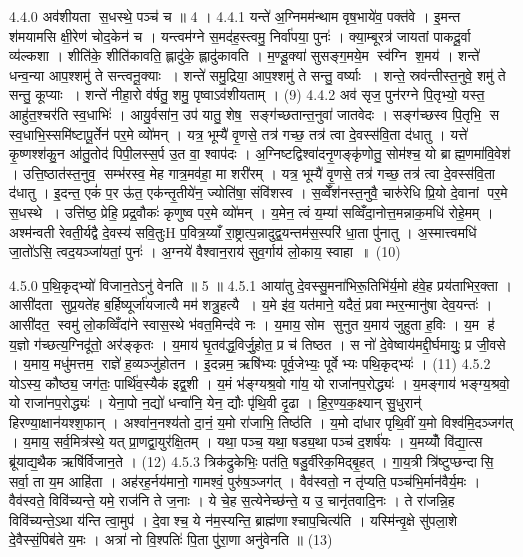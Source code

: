 4.4.0
अव॑शीयता स॒धस्थे॒ पञ्च॑ च ॥ 4 ।
4.4.1
यन्ते॑ अ॒ग्निमम॑न्थाम वृष॒भाये॑व॒ पक्त॑वे । इ॒मन्त श॑मयामसि क्षी॒रेण॑ चोद॒केन॑ च । यन्त्वम॑ग्ने स॒मद॑ह॒स्त्वमु॒ निर्वा॑पया॒ पुनः॑ । क्या॒म्बूरत्र॑ जायतां पाकदू॒र्वा व्य॑ल्कशा । शीति॑के॒ शीति॑कावति॒ ह्लादु॑के॒ ह्लादु॑कावति । म॒ण्डू॒क्या॑ सुसङ्ग॒मये॒म स्व॑ग्नि श॒मय॑ । शन्ते॑ धन्व॒न्या आप॒श्शमु॑ ते सन्त्वनू॒क्याः । शन्ते॑ समु॒द्रिया॒ आप॒श्शमु॑ ते सन्तु॒ वर्ष्याः । शन्ते॒ स्रव॑न्तीस्त॒नुवे॒ शमु॑ ते सन्तु॒ कूप्याः । शन्ते॑ नीहा॒रो व॑र्\mbox{}षतु॒ शमु॒ पृष्वाऽव॑शीयताम् । (9)
4.4.2
अव॑ सृज॒ पुन॑रग्ने पि॒तृभ्यो॒ यस्त॒ आहु॑त॒श्चर॑ति स्व॒धाभिः॑ । आयु॒र्वसा॑न॒ उप॑ यातु॒ शेष॒ सङ्ग॑च्छतान्त॒नुवा॑ जातवेदः । सङ्ग॑च्छस्व पि॒तृभि॒ स स्व॒धाभि॒स्समि॑ष्टापू॒र्तेन॑ पर॒मे व्यो॑मन् । यत्र॒ भूम्यै॑ वृ॒णसे॒ तत्र॑ गच्छ॒ तत्र॑ त्वा दे॒वस्स॑वि॒ता द॑धातु । यत्ते॑ कृ॒ष्णश्श॑कु॒न आ॑तु॒तोद॑ पिपी॒लस्स॒र्प उ॒त वा॒ श्वाप॑दः । अ॒ग्निष्टद्विश्वा॑दनृ॒णङ्कृ॑णोतु॒ सोम॑श्च॒ यो ब्राह्म॒णमा॑वि॒वेश॑ । उत्ति॒ष्ठात॑स्त॒नुव॒ सम्भ॑रस्व॒ मेह गात्र॒मव॑हा॒ मा शरी॑रम् । यत्र॒ भूम्यै॑ वृ॒णसे॒ तत्र॑ गच्छ॒ तत्र॑ त्वा दे॒वस्स॑वि॒ता द॑धातु । इ॒दन्त॒ एकं॑ प॒र ऊ॑त॒ एक॑न्तृ॒तीये॑न॒ ज्योति॑षा॒ संवि॑शस्व । स॒व्वेँश॑नस्त॒नुवै॒ चारु॑रेधि प्रि॒यो दे॒वानां पर॒मे स॒धस्थे । उत्ति॑ष्ठ॒ प्रेहि॒ प्रद्र॒वौकः॑ कृणुष्व पर॒मे व्यो॑मन् । य॒मेन॒ त्वं य॒म्या॑ सव्विँदा॒नोत्त॒मन्नाक॒मधि॑ रोहे॒मम् । अश्म॑न्वती रेवती॒र्यद्वै दे॒वस्य॑ सवि॒तुःH प॒वित्र॒य्याँ रा॒ष्ट्रात्प॒न्नादुद्व॒यन्तम॑स॒स्परि॑ धा॒ता पु॑नातु । अ॒स्मात्त्वमधि॑ जा॒तो॑ऽसि॒ त्वद॒यञ्जा॑यतां॒ पुनः॑ । अ॒ग्नये॑ वैश्वान॒राय॑ सुव॒र्गाय॑ लो॒काय॒ स्वाहा ॥ (10)
\anuvakamend

4.5.0
प॒थि॒कृद्भ्यो॑ विजान॒तेऽनु॑ वेनति ॥ 5 ॥
4.5.1
आया॑तु दे॒वस्सु॒मना॑भिरू॒तिभि॑र्य॒मो ह॑वे॒ह प्रय॑ताभिर॒क्ता । आसी॑दता सुप्र॒यते॑ह ब॒र्\mbox{}हिष्यूर्जा॑यजात्यै मम॑ शत्रु॒हत्यै । य॒मे इ॑व॒ यत॑माने॒ यदैतं॒ प्रवाम्भर॒न्मानु॑षा देव॒यन्तः॑ । आसी॑दत॒ स्वमु॑ लो॒कव्विँदा॑ने स्वास॒स्थे भ॑वत॒मिन्द॑वे नः । य॒माय॒ सोम सुनुत य॒माय॑ जुहुता ह॒विः । य॒म ह॑ य॒ज्ञो ग॑च्छत्य॒ग्निदू॑तो॒ अर॑ङ्कृतः । य॒माय॑ घृ॒तव॑द्ध॒विर्जु॒होत॒ प्र च॑ तिष्ठत । स नो॑ दे॒वेष्वाय॑मद्दी॒र्घमायुः॒ प्र जी॒वसे । य॒माय॒ मधु॑मत्तम॒ राज्ञे॑ ह॒व्यञ्जु॑होतन । इ॒दन्नम॒ ऋषि॑भ्यः पूर्व॒जेभ्यः॒ पूर्वेभ्यः पथि॒कृद्भ्यः॑ । (11)
4.5.2
योऽस्य॒ कौष्ठ्य॒ जग॑तः॒ पार्थि॑व॒स्यैक॑ इद्व॒शी । य॒मं भ॑ङ्ग्यश्र॒वो गा॑य॒ यो राजा॑नप॒रोद्ध्यः॑ । य॒मङ्गाय॑ भङ्ग्य॒श्रवो॒ यो राजा॑नप॒रोद्ध्यः॑ । येना॒पो न॒द्यो॑ धन्वा॑नि॒ येन॒ द्यौः पृ॑थि॒वी दृ॒ढा । हि॒र॒ण्य॒क॒क्ष्यान् सु॒धुरान्॑ हिरण्या॒क्षान॑यश्श॒फान् । अश्वा॑न॒नश्य॑तो दा॒नं॒ य॒मो रा॑जाभि॒ तिष्ठ॑ति । य॒मो दा॑धार पृथि॒वीं य॒मो विश्व॑मि॒दञ्जग॑त् । य॒माय॒ सर्व॒मित्र॑स्थे॒ यत् प्रा॒णद्वा॒युर॑क्षि॒तम् । यथा॒ पञ्च॒ यथा॒ षड्य॒था पञ्च॑ द॒शर्\mbox{}ष॑यः । य॒मय्योँ वि॑द्या॒त्स ब्रू॑याद्य॒थैक ऋषि॑र्विजान॒ते । (12)
4.5.3
त्रिक॑द्रुकेभिः॒ पत॑ति॒ षडु॒र्वीरेक॒मिद्बृ॒हत् । गा॒य॒त्री त्रि॑ष्टुप्छन्दासि॒ सर्वा॒ ता य॒म आहि॑ता । अह॑रह॒र्नय॑मानो॒ गामश्वं॒ पुरु॑ष॒ञ्जग॑त् । वैव॑स्वतो॒ न तृ॑प्यति॒ पञ्च॑भि॒र्मान॑वैर्य॒मः । वैव॑स्वते॒ विवि॑च्यन्ते॒ यमे॒ राज॑नि ते ज॒नाः । ये चे॒ह स॒त्येनेच्छ॑न्ते॒ य उ॒ चानृ॑तवादि॒नः । ते रा॑जन्नि॒ह विवि॑च्यन्ते॒ऽथा य॑न्ति त्वा॒मुप॑ । दे॒वाश्च॒ ये न॑म॒स्यन्ति॒ ब्राह्म॑णाश्चाप॒चित्य॑ति । यस्मि॑न्वृ॒क्षे सु॑पला॒शे दे॒वैस्सं॒पिब॑ते य॒मः । अत्रा॑ नो वि॒श्पतिः॑ पि॒ता पु॑रा॒णा अनु॑वेनति ॥ (13)
\anuvakamend

